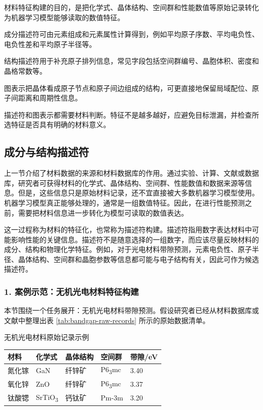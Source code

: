 \begin{sectionkeypoints}
\item 材料特征构建的目的，是把化学式、晶体结构、空间群和性能数值等原始记录转化为机器学习模型能够读取的数值特征。
\item 成分描述符可由元素组成和元素属性计算得到，例如平均原子序数、平均电负性、电负性差和平均原子半径等。
\item 结构描述符用于补充原子排列信息，常见字段包括空间群编号、晶胞体积、密度和晶格常数等。
\item 图表示把晶体看成原子节点和原子间边组成的结构，可更直接地保留局域配位、原子间距离和周期性信息。
\item 描述符和图表示都需要材料判断。特征不是越多越好，应避免目标泄漏，并检查所选特征是否具有明确的材料意义。
\end{sectionkeypoints}

\subsection{成分与结构描述符}

上一节介绍了材料数据的来源和材料数据库的作用。通过实验、计算、文献或数据库，研究者可获得材料的化学式、晶体结构、空间群、性能数值和数据来源等信息。但是，这些信息只是原始材料记录，还不宜直接被大多数机器学习模型使用。机器学习模型真正能够处理的，通常是一组数值特征。因此，在进行性能预测之前，需要把材料信息进一步转化为模型可读取的数值表达。


这一过程称为材料的特征化，也常称为描述符构建。描述符指用数字表达材料中可能影响性能的关键信息。描述符不是随意选择的一组数字，而应该尽量反映材料的成分、结构和物理化学特征。例如，对于光电材料带隙预测，元素电负性、原子半径、晶体结构、空间群和晶胞参数等信息都可能与电子结构有关，因此可作为候选描述符。


\subsubsection*{\textbf{1. 案例示范：无机光电材料特征构建}}

本节围绕一个任务展开：无机光电材料带隙预测。假设研究者已经从材料数据库或文献中整理出表 \ref{tab:bandgap-raw-records} 所示的原始数据清单。


\begin{formalTable}[htbp]
\caption{无机光电材料原始记录示例}
\label{tab:bandgap-raw-records}
\footnotesize
\begin{tabularx}{\textwidth}{@{}YYYYY@{}}
\toprule
\textbf{材料} & \textbf{化学式} & \textbf{晶体结构} & \textbf{空间群} & \textbf{带隙/eV} \\
\midrule
氮化镓 & GaN & 纤锌矿 & P6\textsubscript{3}mc & 3.40 \\
氧化锌 & ZnO & 纤锌矿 & P6\textsubscript{3}mc & 3.37 \\
钛酸锶 & SrTiO\textsubscript{3} & 钙钛矿 & Pm-3m & 3.20 \\
\bottomrule
\end{tabularx}
\end{formalTable}

